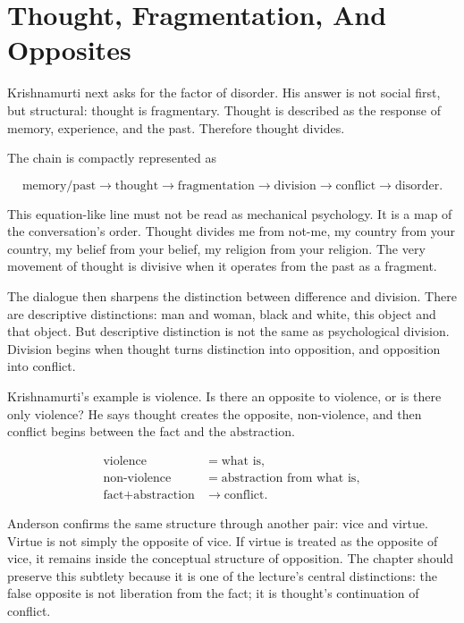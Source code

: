 \section{Thought, Fragmentation, And Opposites}

Krishnamurti next asks for the factor of disorder. His answer is not social first, but structural: thought is fragmentary. Thought is described as the response of memory, experience, and the past. Therefore thought divides.

The chain is compactly represented as

\begin{equation}
\text{memory/past}
\longrightarrow
\text{thought}
\longrightarrow
\text{fragmentation}
\longrightarrow
\text{division}
\longrightarrow
\text{conflict}
\longrightarrow
\text{disorder}.
\end{equation}

This equation-like line must not be read as mechanical psychology. It is a map of the conversation's order. Thought divides me from not-me, my country from your country, my belief from your belief, my religion from your religion. The very movement of thought is divisive when it operates from the past as a fragment.

The dialogue then sharpens the distinction between difference and division. There are descriptive distinctions: man and woman, black and white, this object and that object. But descriptive distinction is not the same as psychological division. Division begins when thought turns distinction into opposition, and opposition into conflict.

Krishnamurti's example is violence. Is there an opposite to violence, or is there only violence? He says thought creates the opposite, non-violence, and then conflict begins between the fact and the abstraction.

\begin{align}
\text{violence} & = \text{what is},\\
\text{non-violence} & = \text{abstraction from what is},\\
\text{fact} + \text{abstraction} & \longrightarrow \text{conflict}.
\end{align}

Anderson confirms the same structure through another pair: vice and virtue. Virtue is not simply the opposite of vice. If virtue is treated as the opposite of vice, it remains inside the conceptual structure of opposition. The chapter should preserve this subtlety because it is one of the lecture's central distinctions: the false opposite is not liberation from the fact; it is thought's continuation of conflict.

